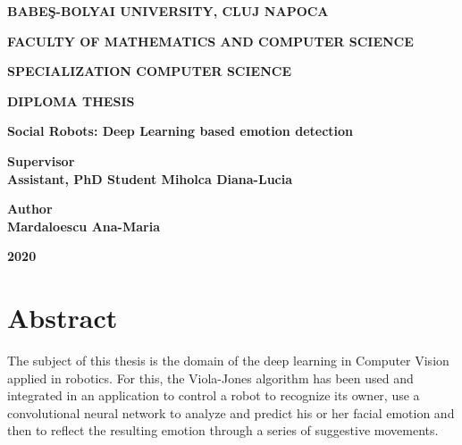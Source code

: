\documentclass[runningheads,a4paper,12pt]{report}
\begin{document}
\begin{titlepage}
\sloppy
\begin{center}
\Large \textbf{BABE\c S-BOLYAI UNIVERSITY, CLUJ NAPOCA}

\Large \textbf{FACULTY OF MATHEMATICS AND COMPUTER SCIENCE}

\Large \textbf{SPECIALIZATION COMPUTER SCIENCE}

\vspace{4cm}

\LARGE \textbf{DIPLOMA THESIS}

\vspace{0.3cm}

\LARGE \textbf {Social Robots: Deep Learning based emotion detection}

\end{center}

\vspace{3cm}

\begin{flushleft}
\LARGE{\textbf{Supervisor}}\\
\LARGE{\textbf{Assistant, PhD Student Miholca Diana-Lucia}}
\end{flushleft}

\vspace{0.5cm}

\begin{flushright}
\LARGE{\textbf{Author}}\\
\LARGE{\textbf{Mardaloescu Ana-Maria}}
\end{flushright}

\vspace{3cm}

\begin{center}
\LARGE{\textbf{2020}}
\end{center}

\newpage

\end{titlepage}


\tableofcontents

\newpage


\chapter*{Abstract}
The subject of this thesis is the domain of the deep learning in Computer Vision applied in robotics. For this, the Viola-Jones algorithm has been used and integrated in an application to control a robot to recognize its owner, use a convolutional neural network to analyze and predict his or her facial emotion and then to reflect the resulting emotion through a series of suggestive movements. 
\end{document}
